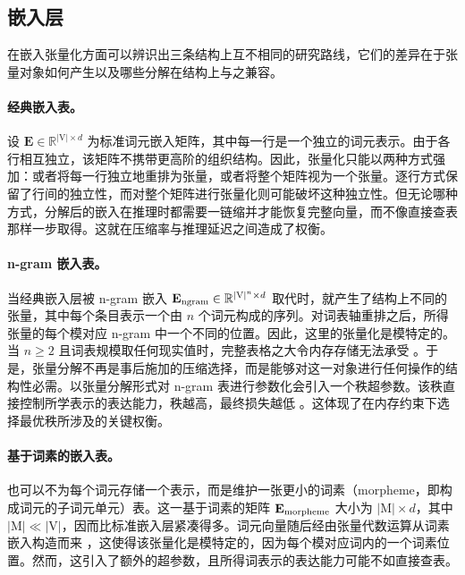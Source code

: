 \documentclass[11pt]{article}
\newcommand{\R}{\mathbb{R}}
\newcommand{\mat}[1]{\mathbf{#1}}
\newcommand{\set}[1]{\mathrm{#1}}
\begin{document}
\subsection{嵌入层}
\label{sec:component-emb}

在嵌入张量化方面可以辨识出三条结构上互不相同的研究路线，它们的差异在于张量对象如何产生以及哪些分解在结构上与之兼容。

\paragraph{经典嵌入表。}
设 $\mat{E} \in \R^{|\set{V}| \times d}$ 为标准词元嵌入矩阵，其中每一行是一个独立的词元表示。由于各行相互独立，该矩阵不携带更高阶的组织结构。因此，张量化只能以两种方式强加：或者将每一行独立地重排为张量，或者将整个矩阵视为一个张量。逐行方式保留了行间的独立性，而对整个矩阵进行张量化则可能破坏这种独立性。但无论哪种方式，分解后的嵌入在推理时都需要一链缩并才能恢复完整向量，而不像直接查表那样一步取得。这就在压缩率与推理延迟之间造成了权衡。

\paragraph{n-gram 嵌入表。}

当经典嵌入层被 n-gram 嵌入 $\mat{E}_{\rm ngram} \in \R^{|\set{V}|^n\times d}$ \cite{huang2025overtokenized} 取代时，就产生了结构上不同的张量，其中每个条目表示一个由 $n$ 个词元构成的序列。对词表轴重排之后，所得张量的每个模对应 n-gram 中一个不同的位置。因此，这里的张量化是模特定的。当 $n\ge 2$ 且词表规模取任何现实值时，完整表格之大令内存存储无法承受 \cite{zhou2026tensorizingengram}。于是，张量分解不再是事后施加的压缩选择，而是能够对这一对象进行任何操作的结构性必需。以张量分解形式对 n-gram 表进行参数化会引入一个秩超参数。该秩直接控制所学表示的表达能力，秩越高，最终损失越低 \cite{zhou2026tensorizingengram}。这体现了在内存约束下选择最优秩所涉及的关键权衡。

\paragraph{基于词素的嵌入表。} 

也可以不为每个词元存储一个表示，而是维护一张更小的词素（morpheme，即构成词元的子词元单元）表。这一基于词素的矩阵 $\mat{E}_{\rm morpheme}$ 大小为 $|\set{M}| \times d$，其中 $|\set{M}| \ll |\set{V}|$，因而比标准嵌入层紧凑得多。词元向量随后经由张量代数运算从词素嵌入构造而来 \cite{gan2022morphte}，这使得该张量化是模特定的，因为每个模对应词内的一个词素位置。然而，这引入了额外的超参数，且所得词表示的表达能力可能不如直接查表。
\end{document}

